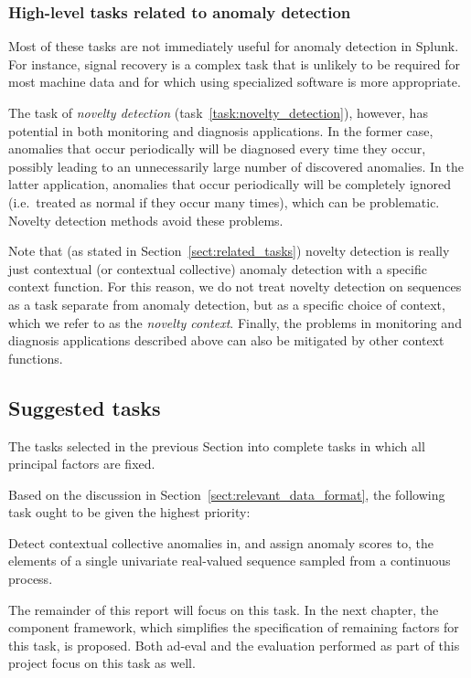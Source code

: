 \subsubsection{High-level tasks related to anomaly detection}

Most of these tasks are not immediately useful for anomaly detection in Splunk. For instance, signal recovery is a complex task that is unlikely to be required for most machine data and for which using specialized software is more appropriate.

The task of \emph{novelty detection} (task~\ref{task:novelty_detection}), however, has potential in both monitoring and diagnosis applications. In the former case, anomalies that occur periodically will be diagnosed every time they occur, possibly leading to an unnecessarily large number of discovered anomalies. In the latter application, anomalies that occur periodically will be completely ignored (i.e.\ treated as normal if they occur many times), which can be problematic. Novelty detection methods avoid these problems.

Note that (as stated in Section~\ref{sect:related_tasks}) novelty detection is really just contextual (or contextual collective) anomaly detection with a specific context function. For this reason, we do not treat novelty detection on sequences as a task separate from anomaly detection, but as a specific choice of context, which we refer to as the \emph{novelty context}. Finally, the problems in monitoring and diagnosis applications described above can also be mitigated by other context functions.

\subsection{Suggested tasks}
\label{sect:suggested_tasks}

The tasks selected in the previous Section into complete tasks in which all principal factors are fixed.

Based on the discussion in Section~\ref{sect:relevant_data_format}, the following task ought to be given the highest priority:
\begin{task}
\label{task:main}
  Detect contextual collective anomalies in, and assign anomaly scores to, the elements of a single univariate real-valued sequence sampled from a continuous process.
\end{task}

The remainder of this report will focus on this task. In the next chapter, the component framework, which simplifies the specification of remaining factors for this task, is proposed. Both ad-eval and the evaluation performed as part of this project focus on this task as well.

